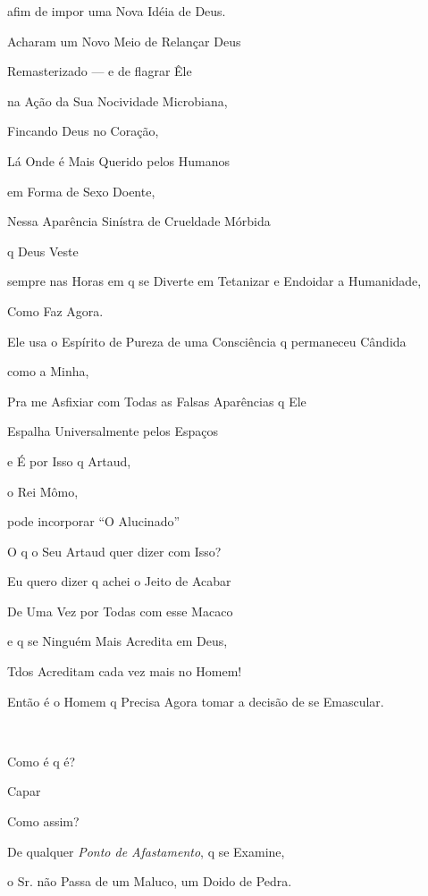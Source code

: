 afim de impor uma Nova Idéia de Deus.

Acharam um Novo Meio de Relançar Deus 

Remasterizado --- e de flagrar Êle

na Ação da Sua Nocividade Microbiana,

Fincando Deus no Coração,

Lá Onde é Mais Querido pelos Humanos

em Forma de Sexo Doente,

Nessa Aparência Sinístra de Crueldade Mórbida

q Deus Veste

sempre nas Horas em q se Diverte em Tetanizar
e Endoidar a Humanidade,

Como Faz Agora.

Ele usa o Espírito de Pureza de uma Consciência q permaneceu Cândida

como a Minha,

Pra me Asfixiar com Todas as Falsas Aparências q Ele

Espalha Universalmente pelos Espaços

e É por Isso q Artaud,

o Rei Mômo,

pode incorporar ``O Alucinado''



O q o Seu Artaud quer dizer com Isso?


Eu quero dizer q achei o Jeito de Acabar

De Uma Vez por Todas com esse Macaco

e q se Ninguém Mais Acredita em Deus,

Tdos Acreditam cada vez mais no Homem!

Então é o Homem q Precisa Agora tomar a decisão de se Emascular.

~


Como é q é?


Capar


Como assim? \EP[3]

De qualquer \emph{Ponto de Afastamento}, q se Examine,

o Sr. não Passa de um Maluco, um Doido de Pedra.


